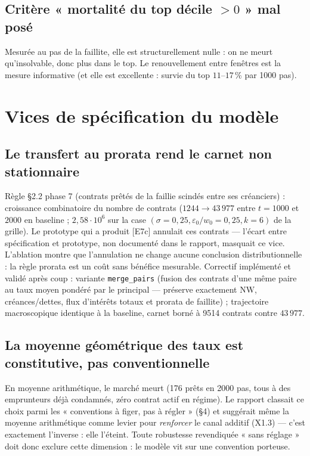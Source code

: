 \documentclass[11pt,a4paper]{article}
\newcommand{\NW}{\mathrm{NW}}
\newcommand{\code}[1]{\texttt{#1}}
\begin{document}
\subsection{Critère « mortalité du top décile $> 0$ » mal posé}
Mesurée au pas de la faillite, elle est structurellement nulle : on ne meurt
qu'insolvable, donc plus dans le top. Le renouvellement entre fenêtres est
la mesure informative (et elle est excellente : survie du top $11$--$17$\,\%
par 1000 pas).

\section{Vices de spécification du modèle}

\subsection{Le transfert au prorata rend le carnet non stationnaire}
Règle §2.2 phase 7 (contrats prêtés de la faillie scindés entre ses
créanciers) : croissance combinatoire du nombre de contrats
($1244 \to 43\,977$ entre $t = 1000$ et $2000$ en baseline ;
$2{,}58 \cdot 10^6$ sur la case $(\sigma=0{,}25, \varepsilon_0/w_0=0{,}25,
k=6)$ de la grille). Le prototype qui a produit [E7c] annulait ces contrats —
l'écart entre spécification et prototype, non documenté dans le rapport,
masquait ce vice. L'ablation montre que l'annulation ne change aucune
conclusion distributionnelle : la règle prorata est un coût sans bénéfice
mesurable. Correctif implémenté et validé après coup : variante
\code{merge\_pairs} (fusion des contrats d'une même paire au taux moyen
pondéré par le principal — préserve exactement $\NW$, créances/dettes, flux
d'intérêts totaux et prorata de faillite) ; trajectoire macroscopique
identique à la baseline, carnet borné à 9514 contrats contre $43\,977$.

\subsection{La moyenne géométrique des taux est constitutive, pas
conventionnelle}
En moyenne arithmétique, le marché meurt (176 prêts en 2000 pas, tous à des
emprunteurs déjà condamnés, zéro contrat actif en régime). Le rapport
classait ce choix parmi les « conventions à figer, pas à régler » (§4) et
suggérait même la moyenne arithmétique comme levier pour \emph{renforcer} le
canal additif (X1.3) — c'est exactement l'inverse : elle l'éteint. Toute
robustesse revendiquée « sans réglage » doit donc exclure cette dimension :
le modèle vit sur une convention porteuse.
\end{document}

